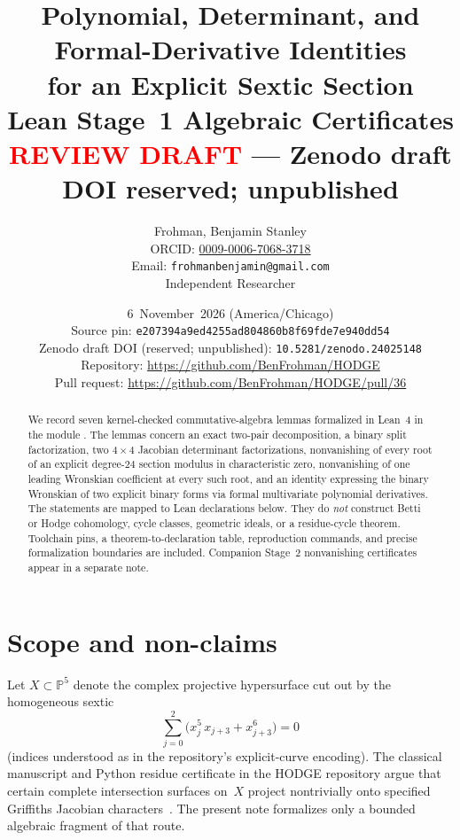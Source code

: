 \documentclass[11pt,a4paper]{article}
\title{\textbf{Polynomial, Determinant, and Formal-Derivative Identities\\
for an Explicit Sextic Section}\\[0.35em]
\large Lean Stage~1 Algebraic Certificates\\[0.4em]
\normalsize\textcolor{red}{\textbf{REVIEW DRAFT}} --- Zenodo draft DOI reserved; unpublished}
\author{Frohman, Benjamin Stanley\\
\small ORCID: \href{https://orcid.org/0009-0006-7068-3718}{0009-0006-7068-3718}\\
\small Email: \texttt{frohmanbenjamin@gmail.com}\\
\small Independent Researcher}
\date{6~November~2026 (America/Chicago)\\
\small Source pin: \texttt{e207394a9ed4255ad804860b8f69fde7e940dd54}\\
\small Zenodo draft DOI (reserved; unpublished): \texttt{10.5281/zenodo.24025148}\\
\small Repository: \url{https://github.com/BenFrohman/HODGE}\\
\small Pull request: \url{https://github.com/BenFrohman/HODGE/pull/36}}
\newcommand{\lean}[1]{\texttt{\detokenize{#1}}}
\theoremstyle{definition}
\begin{document}
\maketitle

\begin{center}
\end{center}

\begin{abstract}
We record seven kernel-checked commutative-algebra lemmas formalized in Lean~4
in the module \lean{Hodge.ExplicitResidueAlgebra}. The lemmas concern an
exact two-pair decomposition, a binary split factorization, two $4\times4$
Jacobian determinant factorizations, nonvanishing of every root of an explicit
degree-$24$ section modulus in characteristic zero, nonvanishing of one
leading Wronskian coefficient at every such root, and an identity expressing
the binary Wronskian of two explicit binary forms via formal multivariate
polynomial derivatives. The statements are mapped to Lean declarations below. They do \emph{not} construct Betti or Hodge
cohomology, cycle classes, geometric ideals, or a residue-cycle theorem.
Toolchain pins, a theorem-to-declaration table, reproduction commands, and
precise formalization boundaries are included. Companion Stage~2
nonvanishing certificates appear in a separate note.
\end{abstract}

\tableofcontents

\section{Scope and non-claims}

Let $X\subset\mathbb{P}^5$ denote the complex projective hypersurface cut out
by the homogeneous sextic
\begin{equation}
\sum_{j=0}^{2}\bigl(x_j^5\,x_{j+3}+x_{j+3}^6\bigr)=0
\end{equation}
{\sloppy
(indices understood as in the repository's explicit-curve encoding).
The classical manuscript and Python residue certificate in the HODGE
repository argue that certain complete intersection surfaces on~$X$
project nontrivially onto specified Griffiths Jacobian
characters~\cite{HODGERepo}. The present note formalizes only a bounded
algebraic fragment of that route.
}
\end{document}
